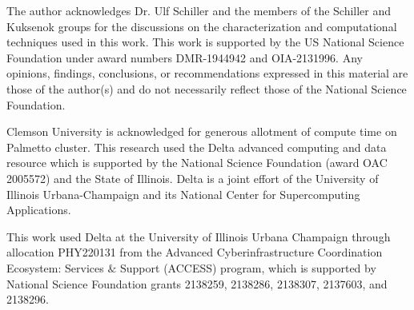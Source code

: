 The author acknowledges Dr. Ulf Schiller and the members of the Schiller and Kuksenok groups for the discussions on 
the characterization and computational techniques used in this work. This work is supported by the US National Science 
Foundation under award numbers DMR-1944942 and OIA-2131996. Any opinions, findings, conclusions, or recommendations 
expressed in this material are those of the author(s) and do not necessarily reflect those of the National Science 
Foundation.  

Clemson University is acknowledged for generous allotment of compute time on Palmetto cluster. This research used the 
Delta advanced computing and data resource which is supported by the National Science Foundation (award OAC 2005572) 
and the State of Illinois. Delta is a joint effort of the University of Illinois Urbana-Champaign and its National 
Center for Supercomputing Applications. 

This work used Delta at the University of Illinois Urbana Champaign through allocation PHY220131 from the Advanced 
Cyberinfrastructure Coordination Ecosystem: Services $\&$ Support (ACCESS) program, which is supported by National 
Science Foundation grants 2138259, 2138286, 2138307, 2137603, and 2138296. 
